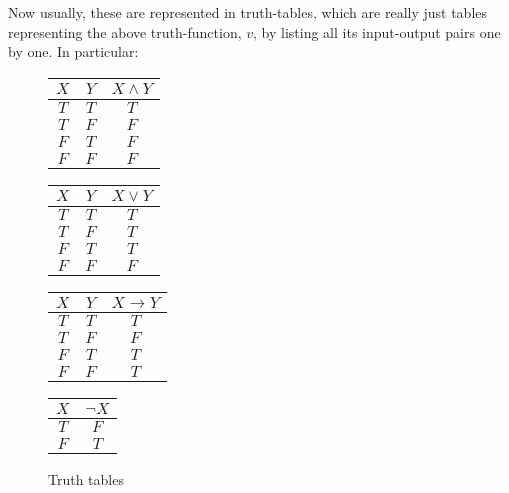 Now usually, these are represented in truth-tables, which are really just tables representing the above truth-function, $v$, by listing all its input-output pairs one by one. In particular:

\begin{figure}[h]
\begin{center}
\begin{minipage}{0.25\textwidth}
\begin{tabular}{|c|c|c|}
	\hline
	$X$ & $Y$ & $X \wedge Y$\\ \hline
	$T$ & $T$ & $T$\\
	$T$ & $F$ & $F$\\
	$F$ & $T$ & $F$\\
	$F$ & $F$ & $F$\\ \hline
\end{tabular}
\end{minipage}
%
\begin{minipage}{0.25\textwidth}
\begin{tabular}{|c|c|c|}
	\hline
	$X$ & $Y$ & $X \vee Y$\\ \hline
	$T$ & $T$ & $T$\\
	$T$ & $F$ & $T$\\
	$F$ & $T$ & $T$\\
	$F$ & $F$ & $F$\\\hline
\end{tabular}
\end{minipage}
%
\begin{minipage}{0.25\textwidth}
\begin{tabular}{|c|c|c|}
	\hline
	$X$ & $Y$ & $X \rightarrow Y$\\ \hline
	$T$ & $T$ & $T$\\
	$T$ & $F$ & $F$\\
	$F$ & $T$ & $T$\\
	$F$ & $F$ & $T$\\ \hline
\end{tabular}
\end{minipage}
%
\begin{minipage}{0.20\textwidth}
\begin{tabular}{|c|c|}
	\hline
	$X$ & $\neg X$\\ \hline
	$T$ & $F$\\
	$F$ & $T$\\ \hline
\end{tabular}
\end{minipage}
\end{center}
\caption{Truth tables}
\label{tto}
\end{figure}

